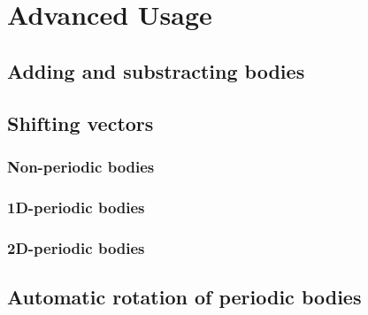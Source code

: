 \section{Advanced Usage}
\subsection{Adding and substracting bodies}
\subsection{Shifting vectors}
\subsubsection{Non-periodic bodies}
\subsubsection{1D-periodic bodies}
\subsubsection{2D-periodic bodies}
\subsection{Automatic rotation of periodic bodies}
